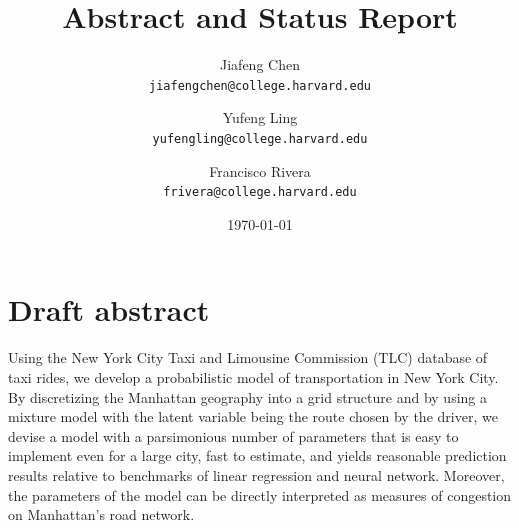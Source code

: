 \documentclass[11pt]{article}
\begin{document}
\title{Abstract and Status Report}
\author{
Jiafeng Chen              \\ \texttt{jiafengchen@college.harvard.edu}
\and Yufeng Ling        \\ \texttt{yufengling@college.harvard.edu}
\and Francisco Rivera   \\ \texttt{frivera@college.harvard.edu}}
\date{\today}

\maketitle





\section{Draft abstract}

Using the New York City Taxi and Limousine Commission (TLC) database of taxi rides, we develop a probabilistic model of transportation in New York City. By discretizing the Manhattan geography into a grid structure and by using a mixture model with the latent variable being the route chosen by the driver, we devise a model with a parsimonious number of parameters that is easy to implement even for a large city, fast to estimate, and yields reasonable prediction results relative to benchmarks of linear regression and neural network. Moreover, the parameters of the model can be directly interpreted as measures of congestion on Manhattan's road network.
\end{document}
